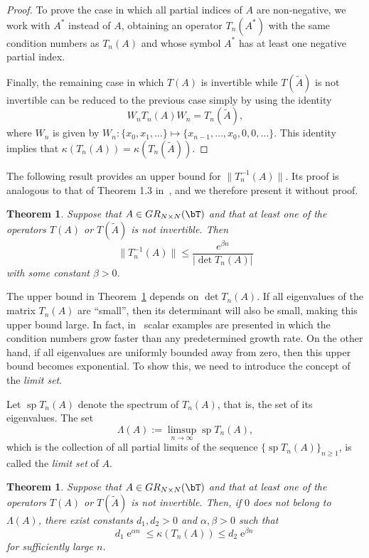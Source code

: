 \documentclass[addpoints,12pt,letter]{article}
\DeclareMathOperator{\e}{e}
\newcommand{\al}{\alpha}
\newcommand{\be}{\beta}
\newcommand{\ka}{\kappa}
\newcommand{\La}{\Lambda}
\newcommand{\nf}{\infty}
\newcommand{\ti}{\tilde}
\renewcommand{\ge}{\geqslant}
\renewcommand{\le}{\leqslant}
\renewcommand{\sp}{\mathop{\mathrm{sp}}}
\numberwithin{equation}{section}
\newtheorem{theorem}[lemma]{Theorem}
\theoremstyle{definition}
\begin{document}
\begin{proof}
To prove the case in which all partial indices of $A$ are non-negative, we work with $A^{\ast}$ instead of $A$, obtaining an operator $T_{n}(A^{\ast})$ with the same condition numbers as $T_{n}(A)$ and whose symbol $A^{\ast}$ has at least one negative partial index.

Finally, the remaining case in which $T(A)$ is invertible while $T(\ti{A})$ is not invertible can be reduced to the previous case simply by using the identity
\[
W_{n} T_{n}(A)W_{n}=T_{n}(\ti{A}),
\]
where $W_{n}$ is given by $W_{n}: \{x_{0}, x_{1}, \ldots\}\mapsto \{x_{n-1}, \ldots ,x_{0},0,0, \ldots\}$.
This identity implies that $\ka(T_{n}(A))=\ka(T_{n}(\ti{A}))$.
\end{proof}

The following result provides an upper bound for $\|T_{n}^{-1}(A)\|$.
Its proof is analogous to that of Theorem 1.3 in~\cite{BoGr99}, and we therefore present it without proof.

\begin{theorem}\label{th:up}
Suppose that $A\in GR_{N\times N}(\bT)$ and that at least one of the operators $T(A)$ or $T(\ti{A})$ is not invertible.
Then
\[
\|T_{n}^{-1}(A)\|\le\frac{e^{\beta n}}{|\det T_{n}(A)|}
\]
with some constant $\beta>0$.
\end{theorem}

The upper bound in Theorem~\ref{th:up} depends on $\det T_{n}(A)$.
If all eigenvalues of the matrix $T_{n}(A)$ are ``small'', then its determinant will also be small, making this upper bound large.
In fact, in~\cite{BoSi99} scalar examples are presented in which the condition numbers grow faster than any predetermined growth rate.
On the other hand, if all eigenvalues are uniformly bounded away from zero, then this upper bound becomes exponential.
To show this, we need to introduce the concept of the {\em limit set}.

Let $\sp T_{n}(A)$ denote the spectrum of $T_{n}(A)$, that is, the set of its eigenvalues.
The set
\[
\La(A):=\limsup_{n\to\nf}\sp T_{n}(A),
\]
which is the collection of all partial limits of the sequence $\{\sp T_{n}(A)\}_{n\ge1}$, is called the {\em limit set} of $A$.

\begin{theorem}\label{th:double}
Suppose that $A\in GR_{N\times N}(\bT)$ and that at least one of the operators $T(A)$ or $T(\ti{A})$ is not invertible.
Then, if $0$ does not belong to $\La(A)$, there exist constants $d_{1},d_{2}>0$ and $\al,\be>0$ such that
\[
d_{1}\e^{\al n}\le\ka(T_{n}(A))\le d_{2}\e^{\be n}
\]
for sufficiently large $n$.
\end{theorem}
\end{document}
